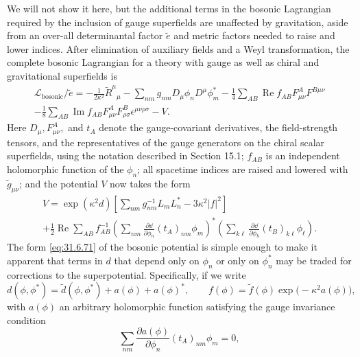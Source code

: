 We will not show it here, but the additional terms in the bosonic
Lagrangian required by the inclusion of gauge superfields are
unaffected by gravitation, aside from an over-all determinantal factor
\(\widetilde e\) and metric factors needed to raise and lower indices.
After elimination of auxiliary fields and a Weyl transformation, the
complete bosonic Lagrangian for a theory with gauge as well as chiral
and gravitational superfields is
\begin{multline}
  \mathcal L_{\mathrm{bosonic}}/\widetilde e
  =-\frac{1}{2\kappa^2}\widetilde R^\mu{}_\mu
   -\sum_{nm}g_{nm}D_\mu\phi_nD^\mu\phi_m^*
   -\frac{1}{4}\sum_{AB}\operatorname{Re}f_{AB}
     F_{\mu\nu}^AF^{B\mu\nu}\\
  -\frac{1}{8}\sum_{AB}\operatorname{Im}f_{AB}
     F_{\mu\nu}^AF_{\rho\sigma}^B\epsilon^{\mu\nu\rho\sigma}
  -V.
  \tag{31.6.70}\label{eq:31.6.70}
\end{multline}
Here \(D_\mu,F_{\mu\nu}^A,\) and \(t_A\) denote the gauge-covariant
derivatives, the field-strength tensors, and the representatives of the
gauge generators on the chiral scalar superfields, using the notation
described in Section 15.1; \(f_{AB}\) is an independent holomorphic
function of the \(\phi_n\); all spacetime indices are raised and lowered
with \(\widetilde g_{\mu\nu}\); and the potential \(V\) now takes the
form
\begin{multline}
  V
  =\exp(\kappa^2d)\left[
    \sum_{nm}g^{-1}_{nm}L_mL_n^*
    -3\kappa^2|f|^2
  \right]\\
  +\frac{1}{2}\operatorname{Re}\sum_{AB}f^{-1}_{AB}
    \left(
      \sum_{nm}\frac{\partial \dd}{\partial\phi_n}
      (t_A)_{nm}\phi_m
    \right)^*
    \left(
      \sum_{k\ell}\frac{\partial \dd}{\partial\phi_k}
      (t_B)_{k\ell}\phi_\ell
    \right).
  \tag{31.6.71}\label{eq:31.6.71}
\end{multline}
The form \eqref{eq:31.6.71} of the bosonic potential is simple enough to
make it apparent that terms in \(d\) that depend only on \(\phi_n\) or
only on \(\phi_n^*\) may be traded for corrections to the
superpotential. Specifically, if we write
\begin{equation}
  d(\phi,\phi^*)
  =\widetilde d(\phi,\phi^*)+a(\phi)+a(\phi)^*,
  \qquad
  f(\phi)=\widetilde f(\phi)\exp\bigl(-\kappa^2a(\phi)\bigr),
  \tag{31.6.72}\label{eq:31.6.72}
\end{equation}
with \(a(\phi)\) an arbitrary holomorphic function satisfying the gauge
invariance condition
\[
  \sum_{nm}\frac{\partial a(\phi)}{\partial\phi_n}
    (t_A)_{nm}\phi_m=0,
\]
